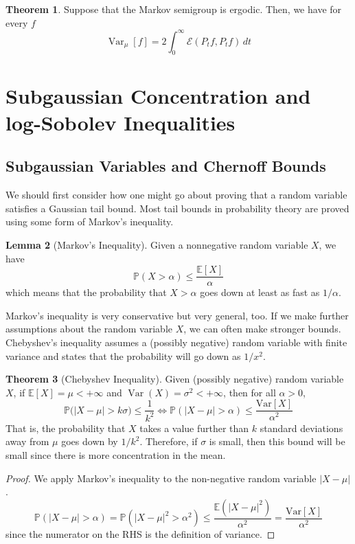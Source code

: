 \documentclass{article}
\DeclareMathOperator{\Var}{Var}
\theoremstyle{definition}
\newtheorem{theorem}{Theorem}[section]
\newtheorem{lemma}[theorem]{Lemma}
\theoremstyle{remark}
\theoremstyle{definition}
\begin{document}
\begin{theorem}
Suppose that the Markov semigroup is ergodic. Then, we have for every $f$ 
\[\Var_\mu [f] = 2 \int_0^\infty \mathcal{E}(P_t f, P_t f) \, dt\]
\end{theorem}

\section{Subgaussian Concentration and log-Sobolev Inequalities}

\subsection{Subgaussian Variables and Chernoff Bounds}

We should first consider how one might go about proving that a random variable satisfies a Gaussian tail bound. Most tail bounds in probability theory are proved using some form of Markov's inequality. 
\begin{lemma}[Markov's Inequality]
Given a nonnegative random variable $X$, we have 
\[\mathbb{P}(X > \alpha) \leq \frac{\mathbb{E}[X]}{\alpha}\]
which means that the probability that $X > \alpha$ goes down at least as fast as $1/\alpha$. 
\end{lemma}

Markov's inequality is very conservative but very general, too. If we make further assumptions about the random variable $X$, we can often make stronger bounds. Chebyshev's inequality assumes a (possibly negative) random variable with finite variance and states that the probability will go down as $1/x^2$. 

\begin{theorem}[Chebyshev Inequality]
Given (possibly negative) random variable $X$, if $\mathbb{E}[X] = \mu < +\infty$ and $\Var(X) = \sigma^2 < +\infty$, then for all $\alpha > 0$, 
\[\mathbb{P} \big( |X - \mu| > k \sigma \big) \leq \frac{1}{k^2} \iff \mathbb{P}(|X - \mu| > \alpha) \leq \frac{\mathrm{Var}[X]}{\alpha^2}\]
That is, the probability that $X$ takes a value further than $k$ standard deviations away from $\mu$ goes down by $1/k^2$. Therefore, if $\sigma$ is small, then this bound will be small since there is more concentration in the mean. 
\end{theorem}
\begin{proof}
We apply Markov's inequality to the non-negative random variable $|X - \mu|$. 
\[\mathbb{P}(|X - \mu| > \alpha) = \mathbb{P}(|X - \mu|^2 > \alpha^2) \leq \frac{\mathbb{E}(|X - \mu|^2)}{\alpha^2} = \frac{\mathrm{Var}[X]}{\alpha^2}\]
since the numerator on the RHS is the definition of variance. 
\end{proof}
\end{document}
